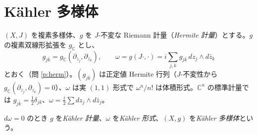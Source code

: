 \section{Kähler 多様体}\label{sec:kahler}

$(X,J)$ を複素多様体、$g$ を $J$-不変な Riemann 計量（\emph{Hermite 計量}）とする。$g$ の複素双線形拡張を $g_{\mathbb C}$ とし、
\[
g_{j\bar k}=g_{\mathbb C}(\partial_{z_j},\partial_{\bar z_k}),\qquad
\omega=g(J\cdot,\cdot)=i\sum_{j,k}g_{j\bar k}\,dz_j\wedge d\bar z_k
\]
とおく（問 \ref{p:herm}）。$(g_{j\bar k})$ は正定値 Hermite 行列（$J$-不変性から $g_{\mathbb C}(\partial_{z_j},\partial_{z_k})=0$）、$\omega$ は実 $(1,1)$ 形式で $\omega^n/n!$ は体積形式。$\mathbb C^n$ の標準計量では $g_{j\bar k}=\frac12\delta_{jk}$、$\omega=\frac i2\sum dz_j\wedge d\bar z_j$。

\begin{defn}[Kähler]
$d\omega=0$ のとき $g$ を\emph{Kähler 計量}、$\omega$ を\emph{Kähler 形式}、$(X,g)$ を\emph{Kähler 多様体}という。
\end{defn}

